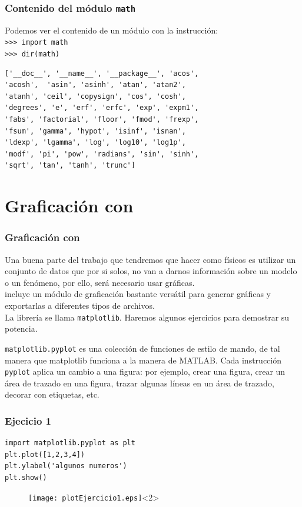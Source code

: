 \begin{frame}[fragile]
\frametitle{Contenido del módulo \texttt{math}}
Podemos ver el contenido de un módulo con la instrucción:
\\
\verb|>>> import math| \\
\verb|>>> dir(math)|
\begin{verbatim}
['__doc__', '__name__', '__package__', 'acos',
'acosh',  'asin', 'asinh', 'atan', 'atan2',
'atanh', 'ceil', 'copysign', 'cos', 'cosh',
'degrees', 'e', 'erf', 'erfc', 'exp', 'expm1',
'fabs', 'factorial', 'floor', 'fmod', 'frexp',
'fsum', 'gamma', 'hypot', 'isinf', 'isnan',
'ldexp', 'lgamma', 'log', 'log10', 'log1p',
'modf', 'pi', 'pow', 'radians', 'sin', 'sinh',
'sqrt', 'tan', 'tanh', 'trunc']
\end{verbatim}
\end{frame}
\section{Graficación con \python}
\begin{frame}
\frametitle{Graficación con \python}
Una buena parte del trabajo que tendremos que hacer como físicos es utilizar un conjunto de datos que por si solos, no van a darnos información sobre un modelo o un fenómeno, por ello, será necesario usar gráficas.
\\
\medskip
\python incluye un módulo de graficación bastante versátil para generar gráficas y exportarlas a diferentes tipos de archivos.
\\
\medskip
La librería se llama \texttt{matplotlib}. Haremos algunos ejercicios para demostrar su potencia.
\end{frame}
\begin{frame}
\texttt{matplotlib.pyplot} es una colección de funciones de estilo de mando, de tal manera que matplotlib funciona a la manera de MATLAB. Cada instrucción \texttt{pyplot} aplica un cambio a una figura: por ejemplo, crear una figura, crear un área de trazado en una figura, trazar algunas líneas en un área de trazado, decorar con etiquetas, etc.
\end{frame}
\begin{frame}[fragile]
\frametitle{Ejecicio 1}
\begin{lstlisting}
import matplotlib.pyplot as plt
plt.plot([1,2,3,4])
plt.ylabel('algunos numeros')
plt.show()
\end{lstlisting}
\begin{figure}
	\centering
	\texttt{[image: plotEjercicio1.eps]}<2> 
\end{figure}
\end{frame}
